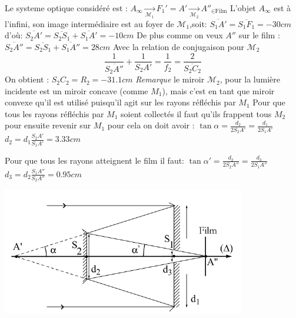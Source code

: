 \begin{Answer}
\Question Le systeme optique considéré est : $A_\infty \xrightarrow[\mathcal{M}_1]{} F_1'=A' \xrightarrow[\mathcal{M}_2]{} A''_{\in \text{Film}}$
L’objet $A_\infty$ est à l’infini, son image intermédiaire est au foyer de $\mathcal{M}_1$,soit:
$\overline{S_1A'}=\overline{S_1F_1}=-30 cm$ d'où:
$\overline{S_2A'}=\overline{S_2S_1}+\overline{S_1A'}= -10cm$
De plus comme on veux $A''$ sur le film :
$\overline{S_2A''} = \overline{S_2S_1}+\overline{S_1A''}=28 cm $
Avec la relation de conjugaison pour $\mathcal{M}_2$
\[ \frac{1}{\overline{S_2A''}}+\frac{1}{S_2A'}=\frac{1}{f_2}=\frac{2}{\overline{S_2C_2}}\]
On obtient :
$S_2C_2=R_2= -31.1 cm$
\emph{Remarque} le miroir $\mathcal{M}_2$, pour la lumière incidente est un miroir concave (comme $M_1$), mais c’est en tant que miroir convexe qu’il est utilisé puisqu’il agit sur les rayons réfléchis par $M_1$
\Question Pour que tous les rayons réfléchis par $M_1$ soient collectés il faut qu'ils frappent tous $M_2$ pour ensuite revenir sur $M_1$ pour cela on doit avoir :
 $\tan \alpha =\frac{d_2}{2S_2A'}=\frac{d_1}{2S_1A'}$ \\
$d_2= d_1 \frac{S_2A'}{S_1A'}=3.33cm$

\Question Pour que tous les rayons atteignent le film il faut:
$\tan \alpha' = \frac{d_2}{2S_2A''}=\frac{d_3}{2S_1A''}$
\\
$d_3=d_2 \frac{S_1A''}{S_2A''}=0.95cm$
\begin{center}
	\includegraphics[scale=0.8]{./fig/teleob_plein.png}
\end{center}
\end{Answer}
